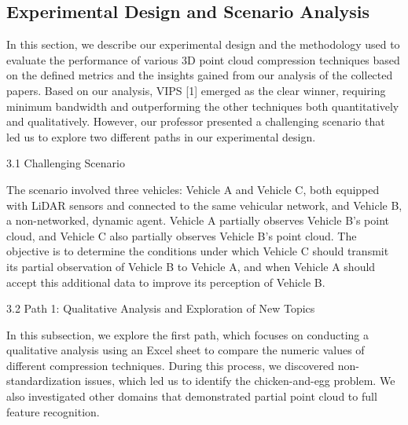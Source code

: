 \documentclass[conference]{IEEEtran}
\begin{document}





\subsection{Experimental Design and Scenario Analysis}
In this section, we describe our experimental design and the methodology used to evaluate the performance of various 3D point cloud compression techniques based on the defined metrics and the insights gained from our analysis of the collected papers. Based on our analysis, VIPS [1] emerged as the clear winner, requiring minimum bandwidth and outperforming the other techniques both quantitatively and qualitatively. However, our professor presented a challenging scenario that led us to explore two different paths in our experimental design.

3.1 Challenging Scenario

The scenario involved three vehicles: Vehicle A and Vehicle C, both equipped with LiDAR sensors and connected to the same vehicular network, and Vehicle B, a non-networked, dynamic agent. Vehicle A partially observes Vehicle B's point cloud, and Vehicle C also partially observes Vehicle B's point cloud. The objective is to determine the conditions under which Vehicle C should transmit its partial observation of Vehicle B to Vehicle A, and when Vehicle A should accept this additional data to improve its perception of Vehicle B.

3.2 Path 1: Qualitative Analysis and Exploration of New Topics

In this subsection, we explore the first path, which focuses on conducting a qualitative analysis using an Excel sheet to compare the numeric values of different compression techniques. During this process, we discovered non-standardization issues, which led us to identify the chicken-and-egg problem. We also investigated other domains that demonstrated partial point cloud to full feature recognition.
\end{document}
